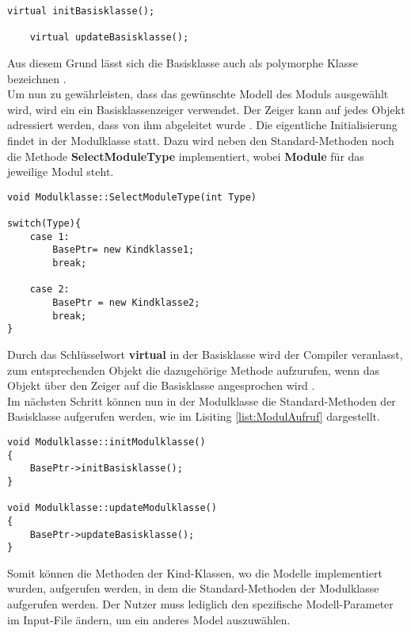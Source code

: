 \begin{lstlisting}[label = {list:Basisklasse}, caption = Aufbau des Header-Files der Basisklasse,captionpos=b]
	virtual initBasisklasse();

	virtual updateBasisklasse();
\end{lstlisting}
Aus diesem Grund lässt sich die Basisklasse auch als polymorphe Klasse bezeichnen \cite{Wolf.2014}. \\
Um nun zu gewährleisten, dass das gewünschte Modell des Moduls ausgewählt wird, wird ein ein Basisklassenzeiger verwendet. Der Zeiger kann auf jedes Objekt adressiert werden, dass von ihm abgeleitet wurde \cite{Wolf.2014}. Die eigentliche Initialisierung findet in der Modulklasse statt. Dazu wird neben den Standard-Methoden noch die Methode \textbf{SelectModuleType} implementiert, wobei \textbf{Module} für das jeweilige Modul steht. \newpage
\begin{lstlisting}[label = {list:ModulAuswahl}, caption = Basisklassenzeiger im Modul.cpp File ,captionpos=b]
void Modulklasse::SelectModuleType(int Type)

switch(Type){
	case 1:
		BasePtr= new Kindklasse1;
		break;
	
	case 2: 
		BasePtr = new Kindklasse2;
		break;
}

\end{lstlisting}
Durch das Schlüsselwort \textbf{virtual} in der Basisklasse wird der Compiler veranlasst, zum entsprechenden Objekt die dazugehörige Methode aufzurufen, wenn das Objekt über den Zeiger auf die Basisklasse angesprochen wird \cite{Wolf.2014}. \\
Im nächsten Schritt können nun in der Modulklasse die Standard-Methoden der Basisklasse aufgerufen werden, wie im Lisiting \ref{list:ModulAufruf} dargestellt.
\begin{lstlisting}[label = {list:ModulAufruf}, caption = Aufruf der Standard-Methoden  im Modul.cpp File ,captionpos=b]
void Modulklasse::initModulklasse()
{
	BasePtr->initBasisklasse();
}

void Modulklasse::updateModulklasse()
{
	BasePtr->updateBasisklasse();
}
\end{lstlisting}

Somit können die Methoden der Kind-Klassen, wo die Modelle implementiert wurden, aufgerufen werden, in dem die Standard-Methoden der Modulklasse aufgerufen werden. Der Nutzer muss lediglich den spezifische Modell-Parameter im Input-File ändern, um ein anderes Model auszuwählen.
\newpage
